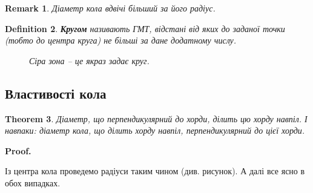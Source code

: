 \documentclass[a4paper, 10pt]{article}
\makeatletter
\theoremstyle{theoremdd}
\newtheorem{theorem}{Theorem}[subsection]
\theoremstyle{theoremdd}
\theoremstyle{theoremdd}
\newtheorem{definition}[theorem]{Definition}
\theoremstyle{theoremdd}
\theoremstyle{theoremdd}
\theoremstyle{theoremdd}
\theoremstyle{theoremdd}
\newtheorem{remark}[theorem]{Remark}
\theoremstyle{theoremdd}
\theoremstyle{theoremdd}
\renewenvironment{proof}[1][Proof.\\]{\par
\pushQED{\hfill \qed}%
\normalfont \topsep6\p@\@plus6\p@\relax
\trivlist
\item\relax
{\bfseries
#1\@addpunct{.}}\hspace\labelsep\ignorespaces
}{%
\popQED\endtrivlist\@endpefalse
}
\makeatother
\begin{document}
\begin{remark}
Діаметр кола вдвічі більший за його радіус.
\end{remark}

\begin{definition}
\textbf{Кругом} називають ГМТ, відстані від яких до заданої точки (тобто до центра круга) не більші за дане додатному числу.
\begin{figure}[H]
\centering
{}
\caption*{Сіра зона -- це якраз задає круг.}
\end{figure}
\end{definition}

\subsection{Властивості кола}
\begin{theorem}
Діаметр, що перпендикулярний до хорди, ділить цю хорду навпіл. І навпаки: діаметр кола, що ділить хорду навпіл, перпендикулярний до цієї хорди.
\end{theorem}

\begin{proof}
Із центра кола проведемо радіуси таким чином (див. рисунок). А далі все ясно в обох випадках. \qedhere
\begin{figure}[H]
\centering
{}
\end{figure}
\end{proof}
\end{document}
